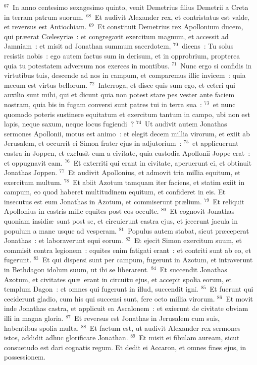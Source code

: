 ${}^{67}$~In anno centesimo sexagesimo quinto, venit Demetrius filius Demetrii a Creta in terram patrum suorum.
${}^{68}$~Et audivit Alexander rex, et contristatus est valde, et reversus est Antiochiam.
${}^{69}$~Et constituit Demetrius rex Apollonium ducem, qui pr\ae erat Cœlesyri\ae~: et congregavit exercitum magnum, et accessit ad Jamniam~: et misit ad Jonathan summum sacerdotem,
${}^{70}$~dicens~: Tu solus resistis nobis~: ego autem factus sum in derisum, et in opprobrium, propterea quia tu potestatem adversum nos exerces in montibus.
${}^{71}$~Nunc ergo si confidis in virtutibus tuis, descende ad nos in campum, et comparemus illic invicem~: quia mecum est virtus bellorum.
${}^{72}$~Interroga, et disce quis sum ego, et ceteri qui auxilio sunt mihi, qui et dicunt quia non potest stare pes vester ante faciem nostram, quia bis in fugam conversi sunt patres tui in terra sua~:
${}^{73}$~et nunc quomodo poteris sustinere equitatum et exercitum tantum in campo, ubi non est lapis, neque saxum, neque locus fugiendi~?
${}^{74}$~Ut audivit autem Jonathas sermones Apollonii, motus est animo~: et elegit decem millia virorum, et exiit ab Jerusalem, et occurrit ei Simon frater ejus in adjutorium~:
${}^{75}$~et applicuerunt castra in Joppen, et exclusit eum a civitate, quia custodia Apollonii Joppe erat~: et oppugnavit eam.
${}^{76}$~Et exterriti qui erant in civitate, aperuerunt ei, et obtinuit Jonathas Joppen.
${}^{77}$~Et audivit Apollonius, et admovit tria millia equitum, et exercitum multum.
${}^{78}$~Et abiit Azotum tamquam iter faciens, et statim exiit in campum, eo quod haberet multitudinem equitum, et confideret in eis. Et insecutus est eum Jonathas in Azotum, et commiserunt pr\ae lium.
${}^{79}$~Et reliquit Apollonius in castris mille equites post eos occulte.
${}^{80}$~Et cognovit Jonathas quoniam insidi\ae\ sunt post se, et circuierunt castra ejus, et jecerunt jacula in populum a mane usque ad vesperam.
${}^{81}$~Populus autem stabat, sicut pr\ae ceperat Jonathas~: et laboraverunt equi eorum.
${}^{82}$~Et ejecit Simon exercitum suum, et commisit contra legionem~: equites enim fatigati erant~: et contriti sunt ab eo, et fugerunt.
${}^{83}$~Et qui dispersi sunt per campum, fugerunt in Azotum, et intraverunt in Bethdagon idolum suum, ut ibi se liberarent.
${}^{84}$~Et succendit Jonathas Azotum, et civitates qu\ae\ erant in circuitu ejus, et accepit spolia eorum, et templum Dagon~: et omnes qui fugerunt in illud, succendit igni.
${}^{85}$~Et fuerunt qui ceciderunt gladio, cum his qui succensi sunt, fere octo millia virorum.
${}^{86}$~Et movit inde Jonathas castra, et applicuit ea Ascalonem~: et exierunt de civitate obviam illi in magna gloria.
${}^{87}$~Et reversus est Jonathas in Jerusalem cum suis, habentibus spolia multa.
${}^{88}$~Et factum est, ut audivit Alexander rex sermones istos, addidit adhuc glorificare Jonathan.
${}^{89}$~Et misit ei fibulam auream, sicut consuetudo est dari cognatis regum. Et dedit ei Accaron, et omnes fines ejus, in possessionem.

